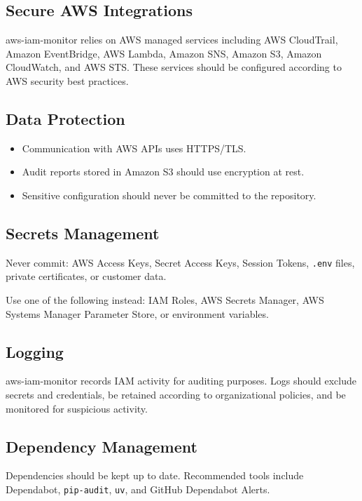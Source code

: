 \documentclass[11pt,a4paper]{report}
\begin{document}
\subsection{Secure AWS Integrations}

aws-iam-monitor relies on AWS managed services including AWS CloudTrail,
Amazon EventBridge, AWS Lambda, Amazon SNS, Amazon S3, Amazon CloudWatch, and
AWS STS. These services should be configured according to AWS security best
practices.

\subsection{Data Protection}

\begin{itemize}[leftmargin=1.4em]
  \item Communication with AWS APIs uses HTTPS/TLS.
  \item Audit reports stored in Amazon S3 should use encryption at rest.
  \item Sensitive configuration should never be committed to the repository.
\end{itemize}

\subsection{Secrets Management}

Never commit: AWS Access Keys, Secret Access Keys, Session Tokens,
\texttt{.env} files, private certificates, or customer data.

Use one of the following instead: IAM Roles, AWS Secrets Manager, AWS
Systems Manager Parameter Store, or environment variables.

\subsection{Logging}

aws-iam-monitor records IAM activity for auditing purposes. Logs should
exclude secrets and credentials, be retained according to organizational
policies, and be monitored for suspicious activity.

\subsection{Dependency Management}

Dependencies should be kept up to date. Recommended tools include
Dependabot, \texttt{pip-audit}, \texttt{uv}, and GitHub Dependabot Alerts.
\end{document}
